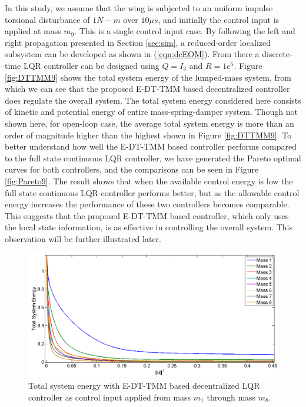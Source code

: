 \documentclass[11pt]{ucthesis}
\begin{document}
In this study, we assume that the wing is subjected to an uniform impulse torsional disturbance of $1 N-m$ over $10\mu s$, and initially the control input is applied at mass $m_9$. This is a single control input case. By following the left and right propagation presented in Section \ref{sec:sim}, a reduced-order localized subsystem can be developed as shown in (\ref{eqn:dcEOM}). From there a discrete-time LQR controller can be designed using $Q = I_3$ and $R = 1e^5$. Figure \ref{fig:DTTMM9} shows the total system energy of the lumped-mass system, from which we can see that the proposed E-DT-TMM based decentralized controller does regulate the overall system. The total system energy considered here consists of kinetic and potential energy of entire mass-spring-damper system. Though not shown here, for open-loop case, the average total system energy is more than an order of magnitude higher than the highest shown in Figure \ref{fig:DTTMM9}. To better understand how well the E-DT-TMM based controller performs compared to the full state continuous LQR controller, we have generated the Pareto optimal curves for both controllers, and the comparisons can be seen in Figure \ref{fig:Pareto9}. The result shows that when the available control energy is low the full state continuous LQR controller performs better, but as the allowable control energy increases the performance of these two controllers becomes comparable. This suggests that the proposed E-DT-TMM based controller, which only uses the local state information, is as effective in controlling the overall system. This observation will be further illustrated later. 

\begin{figure}[thpb]
\centering
\includegraphics[width=1\linewidth]{Figures/FirstHalfPareto.png}
\caption{Total system energy with E-DT-TMM based decentralized LQR controller as control input applied from mass $m_1$ through mass $m_8$.}
\label{fig:FirstHalfDPareto}
\end{figure}
 
\end{document}

